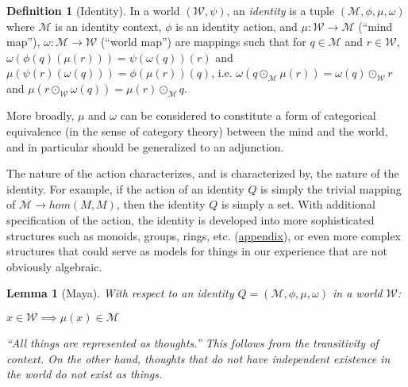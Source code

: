 \documentclass[pra,twocolumn,groupedaddress,10pt]{revtex4}
\newtheorem{lemma}[theorem]{Lemma}
\theoremstyle{definition}
\newtheorem{defn}{Definition}[section]
\begin{document}
\begin{defn}[Identity]
	In a world $(\mathcal{W}, \psi)$, an \emph{identity} is a tuple $(\mathcal{M}, \phi, \mu, \omega)$ where $\mathcal{M}$ is an identity context, $\phi$ is an identity action, and $\mu : \mathcal{W} \rightarrow \mathcal{M}$ (``mind map''), $\omega : \mathcal{M} \rightarrow \mathcal{W}$ (``world map'') are mappings such that for $q \in \mathcal{M}$ and $r \in \mathcal{W}$, $\omega(\phi(q)(\mu(r))) = \psi(\omega(q))(r)$ and $\mu(\psi(r)(\omega(q))) = \phi(\mu(r))(q)$, i.e. $\omega(q \odot_{\mathcal{M}} \mu(r)) = \omega(q) \odot_{\mathcal{W}} r$ and $\mu(r \odot_{\mathcal{W}} \omega(q)) = \mu(r) \odot_{\mathcal{M}} q$.

	\begin{center}
	\end{center}
\end{defn}

More broadly, $\mu$ and $\omega$ can be considered to constitute a form of categorical equivalence (in the sense of category theory) between the mind and the world, and in particular should be generalized to an adjunction.

The nature of the action characterizes, and is characterized by, the nature of the identity. For example, if the action of an identity $Q$ is simply the trivial mapping of $\mathcal{M} \rightarrow hom(M,M)$, then the identity $Q$ is simply a set. With additional specification of the action, the identity is developed into more sophisticated structures such as monoids, groups, rings, etc. (\hyperref[app:algact]{appendix}), or even more complex structures that could serve as models for things in our experience that are not obviously algebraic.

\begin{lemma}[Maya] \label{lem:maya}
	With respect to an identity $Q = (\mathcal{M}, \phi, \mu, \omega)$ in a world $\mathcal{W}$:
	\begin{center}
		$x \in \mathcal{W} \implies \mu(x) \in \mathcal{M}$
	\end{center}
	 ``All things are represented as thoughts.'' This follows from the transitivity of context. On the other hand, thoughts that do not have independent existence in the world do not exist as things.
\end{lemma}
\end{document}
